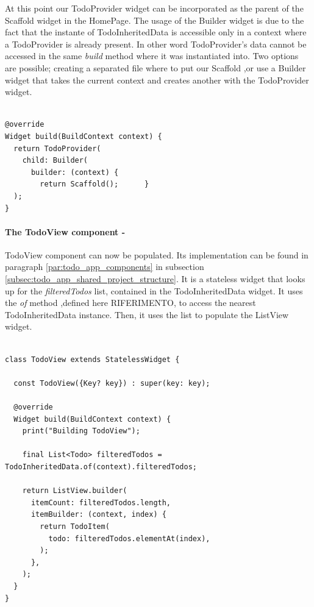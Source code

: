 At this point our TodoProvider widget can be incorporated as the parent of the Scaffold widget in the HomePage. The usage of the Builder widget is due to the fact that the instante of TodoInheritedData is accessible only in a context where a TodoProvider is already present. In other word TodoProvider’s data cannot be accessed in the same \textit{build } method where it was instantiated into. Two options are possible; creating a separated file where to put our Scaffold ,or use a Builder widget that takes the current context and creates another with the TodoProvider widget.
\mbox{}\\
\begin{code}

 \mbox{}

\label{code:2.20}
\begin{verbatim}

@override
Widget build(BuildContext context) {
  return TodoProvider(
    child: Builder(
      builder: (context) {
        return Scaffold();      }
  );
}
\end{verbatim}
\end{code}
\paragraph{The TodoView component - }
\label{subpar:todo_app_inherited_widget_todoview_component}
TodoView component can now be populated. Its implementation can be found in paragraph \ref{par:todo_app_components} in subsection \ref{subsec:todo_app_shared_project_structure}. It is a stateless widget that looks up for the \textit{filteredTodos} list, contained in the TodoInheritedData widget. It uses the \textit{of} method ,defined here RIFERIMENTO, to access the nearest TodoInheritedData instance. Then, it uses the list to populate the ListView widget. 
\mbox{}\\

\begin{code}
 \mbox{}

\label{code:2.21}
\begin{verbatim}

class TodoView extends StatelessWidget {

  const TodoView({Key? key}) : super(key: key);

  @override
  Widget build(BuildContext context) {
    print("Building TodoView");

    final List<Todo> filteredTodos = TodoInheritedData.of(context).filteredTodos;

    return ListView.builder(
      itemCount: filteredTodos.length,
      itemBuilder: (context, index) {
        return TodoItem(
          todo: filteredTodos.elementAt(index),
        );
      },
    );
  }
}
\end{verbatim}
\end{code}

